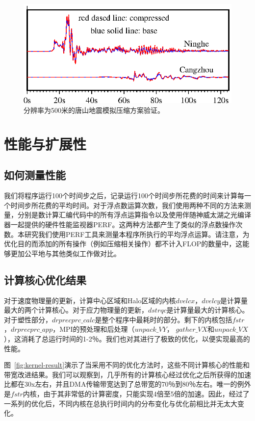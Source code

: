 \documentclass[degree=doctor]{thuthesis}
\begin{document}
\begin{figure}[h]
\centering
\includegraphics[width=0.9\columnwidth]{CompareCompress.eps}
\caption{分辨率为500米的唐山地震模拟压缩方案验证。}
\label{fig:compress_valid}
\end{figure}

\section{性能与扩展性}

\subsection{如何测量性能}

我们将程序运行100个时间步之后，记录运行100个时间步所花费的时间来计算每一个时间步所花费的平均时间。对于浮点数运算次数，我们使用两种不同的方法来测量，分别是数计算汇编代码中的所有浮点运算指令以及使用伴随神威太湖之光编译器一起提供的硬件性能监视器PERF。这两种方法都产生了类似的浮点数操作次数。本研究我们使用PERF工具来测量本程序所执行的平均浮点运算。请注意，为优化目的而添加的所有操作（例如压缩相关操作）都不计入FLOP的数量中，这能够更加公平地与其他类似工作做对比。

\subsection{计算核心优化结果}

对于速度物理量的更新，计算中心区域和Halo区域的内核$ dvelcx，dvelcy $是计算量最大的两个计算核心。对于应力物理量的更新，$ dstrqc $是计算量最大的计算核心。对于塑性部分，$ drprecprc\_calc $是整个程序中最耗时的部分。剩下的内核包括$ fstr $，$ drprecprc\_app $，MPI的预处理和后处理（$ unpack\_VY $，
$ gather\_VX $和$ unpack\_VX $），这消耗了总运行时间的1-2％。我们也对其进行了极致的优化，以便实现最高的性能。

图~\ref{fig:kernel-result}演示了当采用不同的优化方法时，这些不同计算核心的性能和带宽改进结果。我们可以观察到，几乎所有的计算核心经过优化之后所获得的加速比都在30x左右，并且DMA传输带宽达到了总带宽的70％到80％左右。唯一的例外是$ fstr $内核，由于其非常低的计算密度，只能实现4倍至5倍的加速。因此，经过了一系列的优化后，不同内核在总执行时间内的分布变化与优化前相比并无太大变化。
\end{document}
